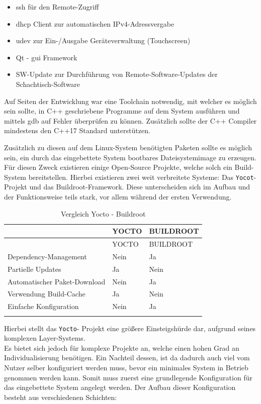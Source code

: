 \begin{itemize}
\tightlist
\item
  \gls{ssh} für den Remote-Zugriff
\item
  \gls{dhcp} Client zur automatischen IPv4-Adressvergabe
\item
  \gls{udev} zur Ein-/Ausgabe Geräteverwaltung (Touchscreen)
\item
  Qt\cite{qtframework} - \gls{gui} Framework
\item
  SW-Update zur Durchführung von Remote-Software-Updates der
  Schachtisch-Software
\end{itemize}

Auf Seiten der Entwicklung war eine Toolchain notwendig, mit welcher es
möglich sein sollte, in C++ geschriebene Programme auf dem System
ausführen und mittels \gls{gdb} auf Fehler überprüfen zu können.
Zusätzlich sollte der C++ Compiler mindestens den C++17 Standard
unterstützen.

Zusätzlich zu diesen auf dem Linux-System benötigten Paketen sollte es
möglich sein, ein durch das eingebettete System bootbares
Dateisystemimage zu erzeugen. Für diesen Zweck existieren einige
Open-Source Projekte, welche solch ein Build-System bereitstellen.
Hierbei existieren zwei weit verbreitete Systeme: Das
\passthrough{\lstinline!Yocot!}-Projekt\cite{yoctoproject} und das
Buildroot\cite{buildrootproject}-Framework. Diese unterscheiden sich
im Aufbau und der Funktionsweise teils stark, vor allem während der
ersten Verwendung.

\begin{longtable}[]{@{}lll@{}}
\caption{Vergleich Yocto - Buildroot
\label{commchesstables}}\tabularnewline
\toprule
& YOCTO & BUILDROOT\tabularnewline
\midrule
\endfirsthead
\toprule
& YOCTO & BUILDROOT\tabularnewline
\midrule
\endhead
Dependency-Management & Nein & Ja\tabularnewline
Partielle Updates & Ja & Nein\tabularnewline
Automatischer Paket-Download & Nein & Ja\tabularnewline
Verwendung Build-Cache & Ja & Nein\tabularnewline
Einfache Konfiguration & Nein & Ja\tabularnewline
& &\tabularnewline
\bottomrule
\end{longtable}

Hierbei stellt das \passthrough{\lstinline!Yocto!}- Projekt eine größere
Einsteigshürde dar, aufgrund seines komplexen Layer-Systems.\\
Es bietet sich jedoch für komplexe Projekte an, welche einen hohen Grad
an Individualisierung benötigen. Ein Nachteil dessen, ist da dadurch
auch viel vom Nutzer selber konfiguriert werden muss, bevor ein
minimales System in Betrieb genommen werden kann. Somit muss zuerst eine
grundlegende Konfiguration für das eingebettete System angelegt werden.
Der Aufbau dieser Konfiguration besteht aus verschiedenen Schichten:

